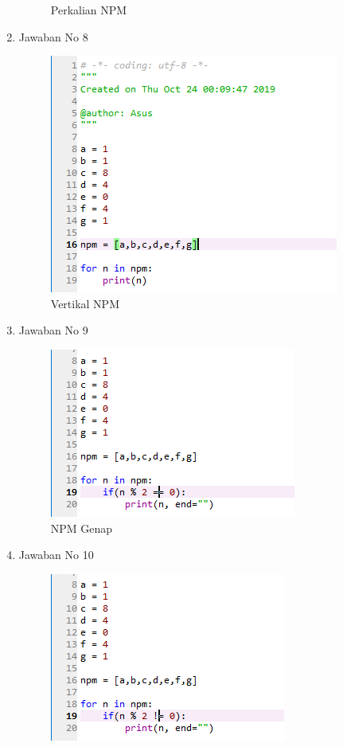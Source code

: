 \documentclass{article}
\begin{document}
\begin{enumerate}
\begin{figure}[!htbp]
        \caption{Perkalian NPM}
    \end{figure}
    \newpage
    \item Jawaban No 8
    \begin{figure}[!htbp]
        \centering
        \includegraphics{Vertikal.PNG}
        \caption{Vertikal NPM}
    \end{figure}
    \item Jawaban No 9
    \begin{figure}[!htbp]
        \centering
        \includegraphics{GenapNPM.PNG}
        \caption{NPM Genap}
    \end{figure}
    \newpage
    \item Jawaban No 10
    \begin{figure}[!htbp]
        \centering
        \includegraphics{GanjilNPM.PNG}

\end{figure}
\end{enumerate}
\end{document}
